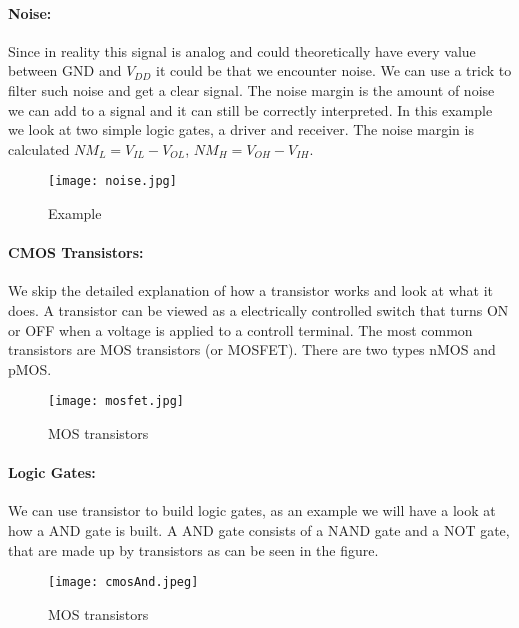 \paragraph{Noise:} Since in reality this signal is analog and could theoretically have every value between GND and $V_{DD}$ it could
be that we encounter noise. We can use a trick to filter such noise and get a clear signal. The noise margin
is the amount of noise we can add to a signal and it can still be correctly interpreted. In this example we look
at two simple logic gates, a driver and receiver. The noise margin is calculated $NM_L = V_{IL} - V_{OL}$, 
$NM_H = V_{OH} - V_{IH}$.

\begin{figure}[h]
    \centering
    \texttt{[image: noise.jpg]}
    \caption{Example}
\end{figure}

\paragraph{CMOS Transistors:} We skip the detailed explanation of how a transistor works and look at what it does.
A transistor can be viewed as a electrically controlled switch that turns ON or OFF when a voltage is applied to a
controll terminal. The most common transistors are MOS transistors (or MOSFET). There are two types nMOS and pMOS. \\

\begin{figure}[h]
    \centering
    \texttt{[image: mosfet.jpg]}
    \caption{MOS transistors}
\end{figure}

\paragraph{Logic Gates:} We can use transistor to build logic gates, as an example we will have a look at how a AND gate is
built. A AND gate consists of a NAND gate and a NOT gate, that are made up by transistors as can be seen in the figure.

\begin{figure}[h]
    \centering
    \texttt{[image: cmosAnd.jpeg]}
    \caption{MOS transistors}
\end{figure}